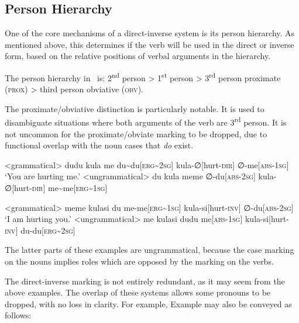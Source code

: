\subsection{Person Hierarchy}\label{sec:person_hierarchy}
One of the core mechanisms of a direct-inverse system is its person hierarchy. As mentioned above, this determines if the verb will be used in the direct or inverse form, based on the relative positions of verbal arguments in the hierarchy.

The person hierarchy in \langname\ is: 2\textsuperscript{nd} person > 1\textsuperscript{st} person > 3\textsuperscript{rd} person proximate (\textsc{prox}) > third person obviative (\textsc{obv}).

The proximate/obviative distinction is particularly notable. It is used to disambiguate situations where both arguments of the verb are 3\textsuperscript{rd} person. It is not uncommon for the proximate/obviate marking to be dropped, due to functional overlap with the noun cases that \textit{do} exist.

\begin{paracol}{2}
\a<grammatical>
\begingl
\glpreamble dudu kula me
\endpreamble
du\textasciitilde du[\textsc{erg\textasciitilde 2sg}]
kula-∅[hurt-\textsc{dir}]
∅-me[\textsc{abs-1sg}]
\glft `You are hurting me.'
\endgl
\switchcolumn
\a<ungrammatical>
\begingl
\glpreamble \ljudge{*} du kula meme
\endpreamble
∅-du[\textsc{abs-2sg}]
kula-∅[hurt-\textsc{dir}]
me\textasciitilde me[\textsc{erg\textasciitilde 1sg}]
\endgl
\end{paracol}
\xe


\begin{paracol}{2}
\a<grammatical>
\begingl
\glpreamble meme kulasi du
\endpreamble
me-me[\textsc{erg\textasciitilde 1sg}]
kula-si[hurt-\textsc{inv}]
∅-du[\textsc{abs-2sg}]
\glft `I am hurting you.'
\endgl
\switchcolumn
\a<ungrammatical>
\begingl
\glpreamble \ljudge{*} me kulasi dudu
\endpreamble
me[\textsc{abs-1sg}]
kula-si[hurt-\textsc{inv}]
du-du[\textsc{erg\textasciitilde 2sg}]
\endgl
\end{paracol}
\xe

The latter parts of these examples are ungrammatical, because the case marking on the nouns implies roles which are opposed by the marking on the verbs.

The direct-inverse marking is not entirely redundant, as it may seem from the above examples. The overlap of these systems allows some pronouns to be dropped, with no loss in clarity. For example, Example  may also be conveyed as follows:

